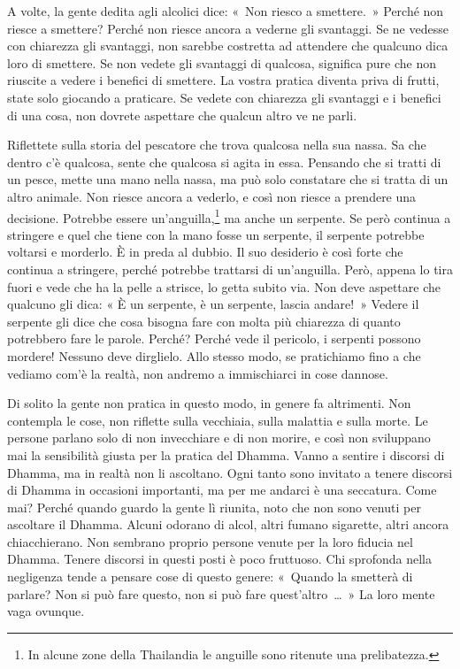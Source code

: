 A volte, la gente dedita agli alcolici dice: «~Non riesco a smettere.~»
Perché non riesce a smettere? Perché non riesce ancora a vederne gli
svantaggi. Se ne vedesse con chiarezza gli svantaggi, non sarebbe
costretta ad attendere che qualcuno dica loro di smettere. Se non vedete
gli svantaggi di qualcosa, significa pure che non riuscite a vedere i
benefici di smettere. La vostra pratica diventa priva di frutti, state
solo giocando a praticare. Se vedete con chiarezza gli svantaggi e i
benefici di una cosa, non dovrete aspettare che qualcun altro ve ne
parli.

Riflettete sulla storia del pescatore che trova qualcosa nella sua
nassa. Sa che dentro c'è qualcosa, sente che qualcosa si agita in essa.
Pensando che si tratti di un pesce, mette una mano nella nassa, ma può
solo constatare che si tratta di un altro animale. Non riesce ancora a
vederlo, e così non riesce a prendere una decisione. Potrebbe essere
un'anguilla,\footnote{In alcune zone della Thailandia le anguille sono
  ritenute una prelibatezza.} ma anche un serpente. Se però continua a
stringere e quel che tiene con la mano fosse un serpente, il serpente
potrebbe voltarsi e morderlo. È in preda al dubbio. Il suo desiderio è
così forte che continua a stringere, perché potrebbe trattarsi di
un'anguilla. Però, appena lo tira fuori e vede che ha la pelle a
strisce, lo getta subito via. Non deve aspettare che qualcuno gli dica:
« È un serpente, è un serpente, lascia andare!~» Vedere il serpente gli
dice che cosa bisogna fare con molta più chiarezza di quanto potrebbero
fare le parole. Perché? Perché vede il pericolo, i serpenti possono
mordere! Nessuno deve dirglielo. Allo stesso modo, se pratichiamo fino a
che vediamo com'è la realtà, non andremo a immischiarci in cose dannose.

Di solito la gente non pratica in questo modo, in genere fa altrimenti.
Non contempla le cose, non riflette sulla vecchiaia, sulla malattia e
sulla morte. Le persone parlano solo di non invecchiare e di non morire,
e così non sviluppano mai la sensibilità giusta per la pratica del
Dhamma. Vanno a sentire i discorsi di Dhamma, ma in realtà non li
ascoltano. Ogni tanto sono invitato a tenere discorsi di Dhamma in
occasioni importanti, ma per me andarci è una seccatura. Come mai?
Perché quando guardo la gente lì riunita, noto che non sono venuti per
ascoltare il Dhamma. Alcuni odorano di alcol, altri fumano sigarette,
altri ancora chiacchierano. Non sembrano proprio persone venute per la
loro fiducia nel Dhamma. Tenere discorsi in questi posti è poco
fruttuoso. Chi sprofonda nella negligenza tende a pensare cose di questo
genere: «~Quando la smetterà di parlare? Non si può fare questo, non si
può fare quest'altro~\ldots{}~» La loro mente vaga ovunque.


